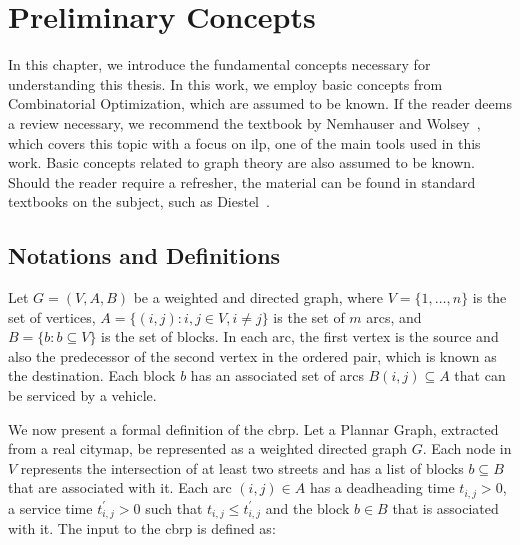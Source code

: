 \chapter{Preliminary Concepts}\label{chp:preliminary-concepts}

In this chapter, we introduce the fundamental concepts necessary for
understanding this thesis. In this work, we employ basic concepts from
Combinatorial Optimization, which are assumed to be known. If the reader deems a
review necessary, we recommend the textbook by Nemhauser and
Wolsey~\cite{Nemhauser}, which covers this topic with a focus on \gls{ilp}, one
of the main tools used in this work. Basic concepts related to graph theory are
also assumed to be known. Should the reader require a refresher, the material
can be found in standard textbooks on the subject, such as
Diestel~\cite{diestel:2005}.


\section{Notations and Definitions}\label{sec:not-e-def}

Let $G = (V, A, B)$ be a weighted and directed graph, where $V = \{1, \dots,
	n\}$ is the set of vertices, $A = \{(i, j) : i, j \in V, i \neq j\}$ is the
set of $m$ arcs, and $B = \{b : b \subseteq V\}$ is the set of blocks. In
each arc, the first vertex is the source and also the predecessor of the
second vertex in the ordered pair, which is known as the destination. Each
block $b$ has an associated set of arcs $B(i, j) \subseteq A$ that can be
serviced by a vehicle.

We now present a formal definition of the \gls{cbrp}. Let a Plannar Graph,
extracted from a real citymap, be represented as a weighted directed graph $G$.
Each node in $V$ represents the intersection of at least two streets and has a
list of blocks $b \subseteq B$ that are associated with it. Each arc $(i, j) \in
	A$ has a deadheading time $t_{i, j} > 0$, a service time $t^{'}_{i, j} > 0$ such
that $t_{i, j} \leqslant t^{'}_{i, j}$ and the block $b \in B$ that is
associated with it. The input to the \gls{cbrp} is defined as:

